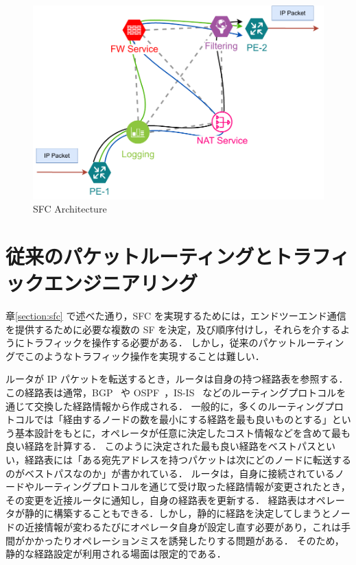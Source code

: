 \begin{figure}[t]
    \centering
    \includegraphics[width=0.95\linewidth]{img/SFC.pdf}
    \caption{SFC Architecture}
    \label{fig:sfc-arc}
\end{figure}

\section{従来のパケットルーティングとトラフィックエンジニアリング}
\label{section:src-rtng}

章\ref*{section:sfc} で述べた通り，SFC を実現するためには，エンドツーエンド通信を提供するために必要な複数の SF を決定，及び順序付けし，それらを介するようにトラフィックを操作する必要がある．
しかし，従来のパケットルーティングでこのようなトラフィック操作を実現することは難しい．

ルータが IP パケットを転送するとき，ルータは自身の持つ経路表を参照する．
この経路表は通常，BGP~\cite{rfc4271} や OSPF~\cite{rfc2328}，IS-IS~\cite{rfc1142} などのルーティングプロトコルを通じて交換した経路情報から作成される．
一般的に，多くのルーティングプロトコルでは「経由するノードの数を最小にする経路を最も良いものとする」という基本設計をもとに，オペレータが任意に決定したコスト情報などを含めて最も良い経路を計算する．
このように決定された最も良い経路をベストパスといい，経路表には「ある宛先アドレスを持つパケットは次にどのノードに転送するのがベストパスなのか」が書かれている．
ルータは，自身に接続されているノードやルーティングプロトコルを通じて受け取った経路情報が変更されたとき，その変更を近接ルータに通知し，自身の経路表を更新する．
経路表はオペレータが静的に構築することもできる．しかし，静的に経路を決定してしまうとノードの近接情報が変わるたびにオペレータ自身が設定し直す必要があり，これは手間がかかったりオペレーションミスを誘発したりする問題がある．
そのため，静的な経路設定が利用される場面は限定的である．

